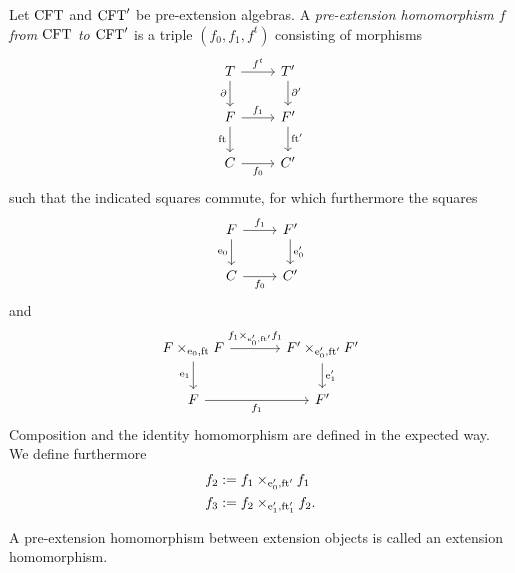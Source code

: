 \begin{defn}
Let $\mathrm{CFT}$ and $\mathrm{CFT}'$ be pre-extension algebras. A \emph{pre-extension 
homomorphism $f$ from $\mathrm{CFT}$ to $\mathrm{CFT}'$} is a triple $(f_0,f_1,f^t)$ 
consisting of morphisms
\begin{equation*}
\begin{tikzcd}
\stesyst 
  \ar{r}{f^t}
  \ar{d}[swap]{\ebd}
  &
\stesyst'
  \ar{d}{\ebd'}
  \\
\stesysf 
  \ar{r}{f_1}
  \ar{d}[swap]{\eft}
  &
\stesysf'
  \ar{d}{\eft'}
  \\
\stesysc 
  \ar{r}[swap]{f_0}
  &
\stesysc'
\end{tikzcd}
\end{equation*}
such that the indicated squares commute, for which furthermore the squares
\begin{equation*}
\begin{tikzcd}
\stesysf \ar{r}{f_1}
  \ar{d}[swap]{\ectxext}
  &
\stesysf'
  \ar{d}{\ectxext'}
  \\
\stesysc
  \ar{r}[swap]{f_0}
  &
\stesysc'
\end{tikzcd}
\end{equation*}
and
\begin{equation*}
\begin{tikzcd}[column sep=large]
\stesysf\times_{\ectxext,\eft} \stesysf
  \ar{r}{f_1\times_{\ectxext',\eft'} f_1}
  \ar{d}[swap]{\efamext}
  &
\stesysf'\times_{\ectxext',\eft'} \stesysf'
  \ar{d}{\efamext'}
  \\
\stesysf
  \ar{r}[swap]{f_1}
  &
\stesysf'
\end{tikzcd}
\end{equation*}
Composition and the identity homomorphism are defined in the expected way. We
define furthermore
\begin{align*}
f_2 & := \pullback{f_1}{f_1}{\ectxext'}{\eft'}
  \\
f_3 & := \pullback{f_2}{f_2}{\efamext'}{\eft[1]'}.
\end{align*}
\end{defn}

\begin{defn}
A pre-extension homomorphism between extension objects is called an extension
homomorphism.
\end{defn}

